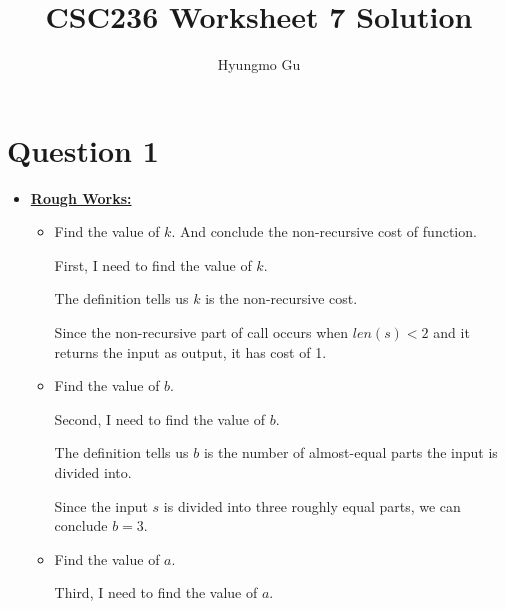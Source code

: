 \documentclass[12pt]{article}
\begin{document}
\title{CSC236 Worksheet 7 Solution}
\author{Hyungmo Gu}
\maketitle

\section*{Question 1}
\begin{itemize}
    \item

    \begin{mdframed}
    \underline{\textbf{Rough Works:}}

    \bigskip

    \begin{itemize}
        \item Find the value of $k$. And conclude the non-recursive cost of function.

        \bigskip

        First, I need to find the value of $k$.

        \begin{mdframed}
        The definition tells us $k$ is the non-recursive cost.

        \bigskip

        Since the non-recursive part of call occurs when $len(s) < 2$ and it
        returns the input as output, it has cost of 1.
        \end{mdframed}

        \item Find the value of $b$.

        \bigskip

        Second, I need to find the value of $b$.

        \bigskip

        \begin{mdframed}
        The definition tells us $b$ is the number of almost-equal parts the input
        is divided into.

        \bigskip

        Since the input $s$ is divided into three roughly equal parts, we can conclude $b = 3$.
        \end{mdframed}

        \item Find the value of $a$.

        \bigskip

        Third, I need to find the value of $a$.


\end{itemize}
\end{mdframed}
\end{itemize}
\end{document}
